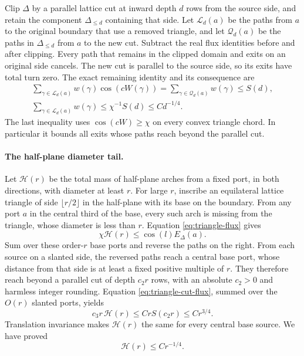 Clip $\Delta$ by a parallel lattice cut at inward depth $d$ rows from
the source side, and retain the component $\Delta_{\le d}$ containing
that side. Let $\mathcal L_d(a)$ be the paths from $a$ to the original
boundary that use a removed triangle, and let $\mathcal Q_d(a)$ be the
paths in $\Delta_{\le d}$ from $a$ to the new cut. Subtract the real
flux identities before and after clipping. Every path that remains in
the clipped domain and exits on an original side cancels. The new cut
is parallel to the source side, so its exits have total turn zero.
The exact remaining identity and its consequence are
\begin{equation}\label{eq:triangle-cut-flux}
 \begin{gathered}
 \sum_{\gamma\in\mathcal L_d(a)}w(\gamma)\cos(cW(\gamma))
       =\sum_{\gamma\in\mathcal Q_d(a)}w(\gamma)\le S(d),\\
 \sum_{\gamma\in\mathcal L_d(a)}w(\gamma)
       \le \chi^{-1}S(d)\le C d^{-1/4}.
 \end{gathered}
\end{equation}
The last inequality uses $\cos(cW)\ge\chi$ on every convex triangle
chord. In particular it bounds all exits whose paths reach beyond the
parallel cut.

\paragraph{The half-plane diameter tail.}
Let $\mathcal H(r)$ be the total mass of half-plane arches from a fixed
port, in both directions, with diameter at least $r$. For large $r$,
inscribe an equilateral lattice triangle of side $\lfloor r/2\rfloor$
in the half-plane with its base on the boundary. From any port $a$ in
the central third of the base, every such arch is missing from the
triangle, whose diameter is less than $r$. Equation
\eqref{eq:triangle-flux} gives
\[
 \chi\mathcal H(r)\le \cos(l)E_\Delta(a).
\]
Sum over these order-$r$ base ports and reverse the paths on the right.
From each source on a slanted side, the reversed paths reach a central
base port, whose distance from that side is at least a fixed positive
multiple of $r$. They therefore reach beyond a parallel cut of depth
$c_2r$ rows, with an absolute $c_2>0$ and harmless integer rounding.
Equation \eqref{eq:triangle-cut-flux}, summed over the $O(r)$ slanted
ports, yields
\[
 c_3r\,\mathcal H(r)\le C r S(c_2r)\le C r^{3/4}.
\]
Translation invariance makes $\mathcal H(r)$ the same for every central
base source. We have proved
\begin{equation}\label{eq:halfplane-diameter-tail}
 \mathcal H(r)\le C r^{-1/4}.
\end{equation}

